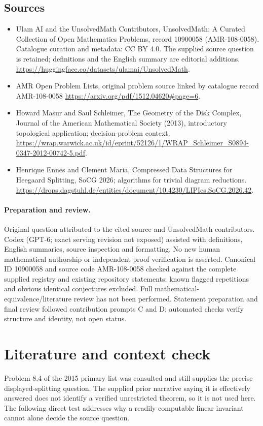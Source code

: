 \documentclass[11pt]{article}
\begin{document}
\subsection{Sources}
\begin{itemize}
\item[S1] Ulam AI and the UnsolvedMath Contributors, UnsolvedMath: A Curated Collection of Open Mathematics Problems, record 10900058 (AMR-108-0058). Catalogue curation and metadata: CC BY 4.0. The supplied source question is retained; definitions and the English summary are editorial additions.
\url{https://huggingface.co/datasets/ulamai/UnsolvedMath}.
\item[S2] AMR Open Problem Lists, original problem source linked by catalogue record AMR-108-0058
\url{https://arxiv.org/pdf/1512.04620#page=6}.
\item[S3] Howard Masur and Saul Schleimer, The Geometry of the Disk Complex, Journal of the American Mathematical Society (2013), introductory topological application; decision-problem context.
\url{https://wrap.warwick.ac.uk/id/eprint/52126/1/WRAP_Schleimer_S0894-0347-2012-00742-5.pdf}.
\item[S4] Henrique Ennes and Clement Maria, Compressed Data Structures for Heegaard Splitting, SoCG 2026; algorithms for trivial diagram reductions.
\url{https://drops.dagstuhl.de/entities/document/10.4230/LIPIcs.SoCG.2026.42}.
\end{itemize}
\paragraph{Preparation and review.}
Original question attributed to the cited source and UnsolvedMath contributors. Codex (GPT-6; exact serving revision not exposed) assisted with definitions, English summaries, source inspection and formatting. No new human mathematical authorship or independent proof verification is asserted. Canonical ID 10900058 and source code AMR-108-0058 checked against the complete supplied registry and existing repository statements; known flagged repetitions and obvious identical conjectures excluded. Full mathematical-equivalence/literature review has not been performed. Statement preparation and final review followed contribution prompts C and D; automated checks verify structure and identity, not open status.
\label{end:10900058}

\section{Literature and context check}
Problem 8.4 of the 2015 primary list was consulted and still supplies the
precise displayed-splitting question. The supplied prior narrative saying it is
effectively answered does not identify a verified unrestricted theorem, so it
is not used here. The following direct test addresses why a readily computable
linear invariant cannot alone decide the source question.
\end{document}
